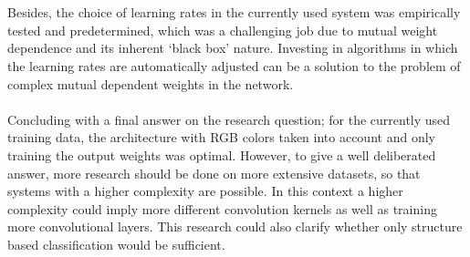 \documentclass[a4paper,onecolumn]{report}
\begin{document}
\\\\
Besides, the choice of learning rates in the currently used system was empirically tested and predetermined, which was a challenging job due to mutual weight dependence and its inherent ‘black box’ nature. Investing in algorithms in which the learning rates are automatically adjusted can be a solution to the problem of complex mutual dependent weights in the network.
\\\\
Concluding with a final answer on the research question; for the currently used training data, the architecture with RGB colors taken into account and only training the output weights was optimal. However, to give a well deliberated answer, more research should be done on more extensive datasets, so that systems with a higher complexity are possible. In this context a higher complexity could imply more different convolution kernels as well as training more convolutional layers. This research could also clarify whether only structure based classification would be sufficient.



\end{document}
